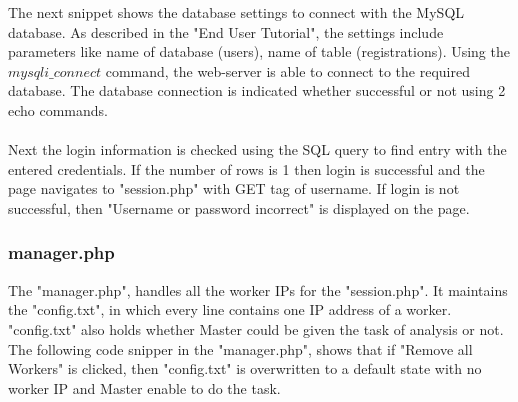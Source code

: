 \documentclass{article}
\begin{document}
The next snippet shows the database settings to connect with the MySQL database. As described in the "End User Tutorial", the settings include parameters like name of database (users), name of table (registrations). Using the $mysqli\_connect$ command, the web-server is able to connect to the required database. The database connection is indicated whether successful or not using 2 echo commands.\\ \\
Next the login information is checked using the SQL query to find entry with the entered credentials. If the number of rows is 1 then login is successful and the page navigates to "session.php" with GET tag of username. If login is not successful, then "Username or password incorrect" is displayed on the page.

\subsubsection{manager.php}
The "manager.php", handles all the worker IPs for the "session.php". It maintains the "config.txt", in which every line contains one IP address of a worker. "config.txt" also holds whether Master could be given the task of analysis or not. The following code snipper in the "manager.php", shows that if "Remove all Workers" is clicked, then "config.txt" is overwritten to a default state with no worker IP and Master enable to do the task.
\end{document}

